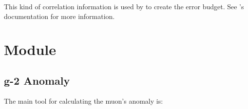 \documentclass[letterpaper,10pt,english]{sphinxmanual}
\begin{document}
This kind of correlation information is used by 
to create the error budget. See ’s documentation
for more information.


\chapter{ Module}
\label{\detokenize{g2tools:g2tools-module}}\label{\detokenize{g2tools::doc}}\label{\detokenize{g2tools:module-g2tools}}

\section{g-2 Anomaly}
\label{\detokenize{g2tools:g-2-anomaly}}
The main tool for calculating the muon’s anomaly is:
\end{document}
